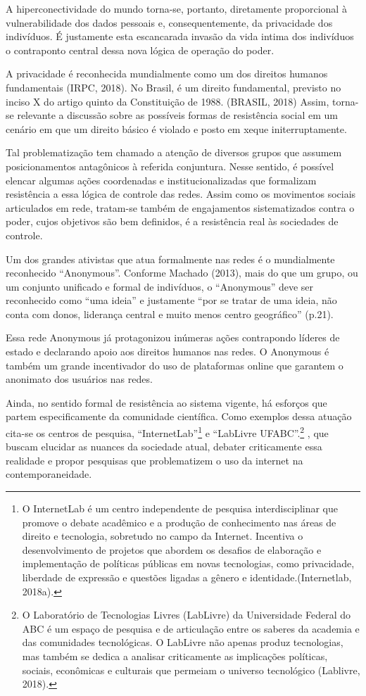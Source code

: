 A hiperconectividade do mundo torna-se, portanto, diretamente
proporcional à vulnerabilidade dos dados pessoais e, consequentemente,
da privacidade dos indivíduos. É justamente esta escancarada invasão da
vida intima dos indivíduos o contraponto central dessa nova lógica de
operação do poder.

A privacidade é reconhecida mundialmente como um dos direitos humanos
fundamentais (IRPC, 2018). No Brasil, é um direito fundamental, previsto
no inciso X do artigo quinto da Constituição de 1988. (BRASIL, 2018)
Assim, torna-se relevante a discussão sobre as possíveis formas de
resistência social em um cenário em que um direito básico é violado e
posto em xeque initerruptamente.

Tal problematização tem chamado a atenção de diversos grupos que assumem
posicionamentos antagônicos à referida conjuntura. Nesse sentido, é
possível elencar algumas ações coordenadas e institucionalizadas que
formalizam resistência a essa lógica de controle das redes. Assim como
os movimentos sociais articulados em rede, tratam-se também de
engajamentos sistematizados contra o poder, cujos objetivos são bem
definidos, é a resistência real às sociedades de controle.

Um dos grandes ativistas que atua formalmente nas redes é o mundialmente
reconhecido ``Anonymous''. Conforme Machado (2013), mais do que um
grupo, ou um conjunto unificado e formal de indivíduos, o ``Anonymous''
deve ser reconhecido como ``uma ideia'' e justamente ``por se tratar de
uma ideia, não conta com donos, liderança central e muito menos centro
geográfico'' (p.21).

Essa rede Anonymous já protagonizou inúmeras ações contrapondo líderes
de estado e declarando apoio aos direitos humanos nas redes. O Anonymous
é também um grande incentivador do uso de plataformas online que
garantem o anonimato dos usuários nas redes.

Ainda, no sentido formal de resistência ao sistema vigente, há esforços
que partem especificamente da comunidade científica. Como exemplos dessa
atuação cita-se os centros de pesquisa, ``InternetLab''\footnote{O
  InternetLab é um centro independente de pesquisa interdisciplinar que
  promove o debate acadêmico e a produção de conhecimento nas áreas de
  direito e tecnologia, sobretudo no campo da Internet. Incentiva o
  desenvolvimento de projetos que abordem os desafios de elaboração e
  implementação de políticas públicas em novas tecnologias, como
  privacidade, liberdade de expressão e questões ligadas a gênero e
  identidade.(Internetlab, 2018a).} e ``LabLivre UFABC''.\footnote{O
  Laboratório de Tecnologias Livres (LabLivre) da Universidade Federal
  do ABC é um espaço de pesquisa e de articulação entre os saberes da
  academia e das comunidades tecnológicas. O LabLivre não apenas produz
  tecnologias, mas também se dedica a analisar criticamente as
  implicações políticas, sociais, econômicas e culturais que permeiam o
  universo tecnológico (Lablivre, 2018).} , que buscam elucidar as
nuances da sociedade atual, debater criticamente essa realidade e propor
pesquisas que problematizem o uso da internet na contemporaneidade.

